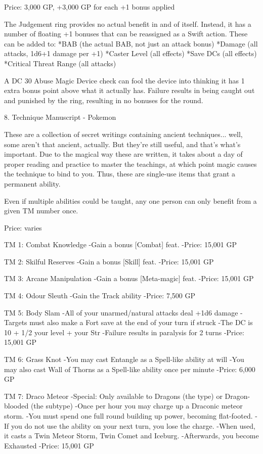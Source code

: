 \begin{multicols}{2}
Price: 3,000 GP, +3,000 GP for each +1 bonus applied

The Judgement ring provides no actual benefit in and of itself. Instead, it has a number of floating +1 bonuses that can be reassigned as a Swift action. These can be added to:
*BAB (the actual BAB, not just an attack bonus)
*Damage (all attacks, 1d6+1 damage per +1)
*Caster Level (all effects)
*Save DCs (all effects)
*Critical Threat Range (all attacks)

A DC 30 Abuse Magic Device check can fool the device into thinking it has 1 extra bonus point above what it actually has. Failure results in being caught out and punished by the ring, resulting in no bonuses for the round.


8. Technique Manuscript - Pokemon

These are a collection of secret writings containing ancient techniques... well, some aren't that ancient, actually. But they're still useful, and that's what's important. Due to the magical way these are written, it takes about a day of proper reading and practice to master the teachings, at which point magic causes the technique to bind to you. Thus, these are single-use items that grant a permanent ability.

Even if multiple abilities could be taught, any one person can only benefit from a given TM number once.

Price: varies

TM 1: Combat Knowledge
-Gain a bonus [Combat] feat.
-Price: 15,001 GP

TM 2: Skilful Reserves
-Gain a bonus [Skill] feat.
-Price: 15,001 GP

TM 3: Arcane Manipulation
-Gain a bonus [Meta-magic] feat.
-Price: 15,001 GP

TM 4: Odour Sleuth
-Gain the Track ability
-Price: 7,500 GP

TM 5: Body Slam
-All of your unarmed/natural attacks deal +1d6 damage
-Targets must also make a Fort save at the end of your turn if struck
-The DC is 10 + 1/2 your level + your Str
-Failure results in paralysis for 2 turns
-Price: 15,001 GP

TM 6: Grass Knot
-You may cast Entangle as a Spell-like ability at will
-You may also cast Wall of Thorns as a Spell-like ability once per minute
-Price: 6,000 GP

TM 7: Draco Meteor
-Special: Only available to Dragons (the type) or Dragon-blooded (the subtype)
-Once per hour you may charge up a Draconic meteor storm.
-You must spend one full round building up power, becoming flat-footed.
-If you do not use the ability on your next turn, you lose the charge.
-When used, it casts a Twin Meteor Storm, Twin Comet and Iceburg.
-Afterwards, you become Exhausted
-Price: 15,001 GP


\end{multicols}
